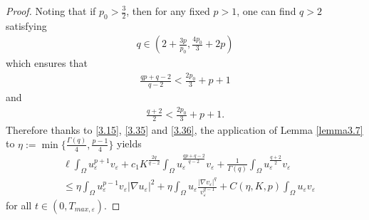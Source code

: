 \documentclass[10pt,a4paper]{amsart}
\begin{document}
\begin{proof}
     Noting that  if $p_0>\frac{3}{2}$, then for any  fixed $p>1$, one can find $q>2$ satisfying
\begin{align}\label{3.34}
    q\in \left( 2+\frac{3p}{p_0},\frac{4p_0}{3}+2p \right)
\end{align}
which ensures that
\begin{align}\label{3.35}
    \frac{qp+q-2}{q-2}<\frac{2p_0}{3}+p+1
\end{align}
and
\begin{align}\label{3.36}
  \frac{q+2}{2}<\frac{2p_0}{3}+p+1.
\end{align}
Therefore thanks to \eqref{3.15}, \eqref{3.35} and \eqref{3.36}, the application of Lemma \ref{lemma3.7} to $\eta:=\min\{\frac{\Gamma(q)} 4, \frac{p-1}4\}$  yields
\begin{align}\label{3.37}
   &\ell\int_{\Omega}u_{\varepsilon}^{p+1}v_{\varepsilon}+c_1K^{\frac{2q}{q-2}}\int_{\Omega}u_{\varepsilon}^{\frac{qp+q-2}{q-2}}v_{\varepsilon}+\frac{1}{\Gamma(q)}\int_{\Omega}u_{\varepsilon}^{\frac{q+2}{2}}v_{\varepsilon}\nonumber
   \\
   &\leq\eta\int_{\Omega}u_{\varepsilon}^{p-1}v_{\varepsilon}|\nabla u_{\varepsilon}|^2+\eta\int_{\Omega}u_{\varepsilon}\frac{|\nabla
   v_{\varepsilon}|^q}{v_{\varepsilon}^{q-1}}+C(\eta,K,p)\int_{\Omega}u_{\varepsilon}v_{\varepsilon}
\end{align}
for all $t\in (0,T_{max,\varepsilon})$.


\end{proof}
\end{document}
